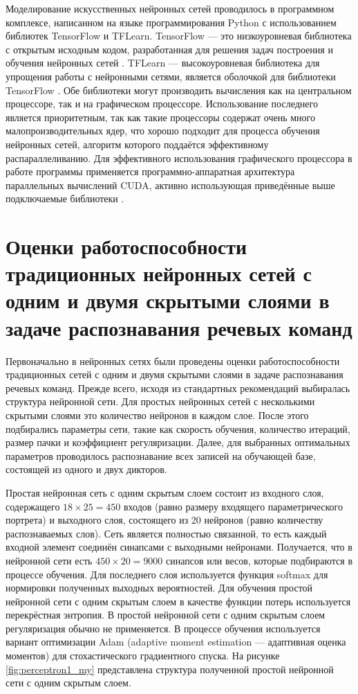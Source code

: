 Моделирование искусственных нейронных сетей проводилось в программном комплексе, написанном на языке программирования Python с использованием библиотек TensorFlow и TFLearn.
TensorFlow --- это низкоуровневая библиотека с открытым исходным кодом, разработанная для решения задач построения и обучения нейронных сетей \cite{tensorflow}.
TFLearn --- высокоуровневая библиотека для упрощения работы с нейронными сетями, является оболочкой для библиотеки TensorFlow \cite{tflearn}.
Обе библиотеки могут производить вычисления как на центральном процессоре, так и на графическом процессоре.
Использование последнего является приоритетным, так как такие процессоры содержат очень много малопроизводительных ядер, что хорошо подходит для процесса обучения нейронных сетей, алгоритм которого поддаётся эффективному распараллеливанию.
Для эффективного использования графического процессора в работе программы применяется программно-аппаратная архитектура параллельных вычислений CUDA, активно использующая приведённые выше подключаемые библиотеки \cite{cuda}.


\section{Оценки работоспособности традиционных нейронных сетей с одним и двумя скрытыми слоями в задаче распознавания речевых команд} \label{sect4_1}

Первоначально в нейронных сетях были проведены оценки работоспособности традиционных сетей с одним и двумя скрытыми слоями в задаче распознавания речевых команд.
Прежде всего, исходя из стандартных рекомендаций выбиралась структура нейронной сети.
Для простых нейронных сетей с несколькими скрытыми слоями это количество нейронов в каждом слое.
После этого подбирались параметры сети, такие как скорость обучения, количество итераций, размер пачки и коэффициент регуляризации.
Далее, для выбранных оптимальных параметров проводилось распознавание всех записей на обучающей базе, состоящей из одного и двух дикторов.

Простая нейронная сеть с одним скрытым слоем состоит из входного слоя, содержащего $18 \times 25 = 450$ входов (равно размеру входящего параметрического портрета) и выходного слоя, состоящего из 20 нейронов (равно количеству распознаваемых слов).
Сеть является полностью связанной, то есть каждый входной элемент соединён синапсами с выходными нейронами.
Получается, что в нейронной сети есть $450 \times 20 = 9000$ синапсов или весов, которые подбираются в процессе обучения.
Для последнего слоя используется функция softmax для нормировки полученных выходных вероятностей.
Для обучения простой нейронной сети с одним скрытым слоем в качестве функции потерь используется перекрёстная энтропия.
В простой нейронной сети с одним скрытым слоем регуляризация обычно не применяется.
В процессе обучения используется вариант оптимизации Adam (adaptive moment estimation --- адаптивная оценка моментов) для стохастического градиентного спуска.
На рисунке \ref{fig:perceptron1_my} представлена структура полученной простой нейронной сети с одним скрытым слоем.

